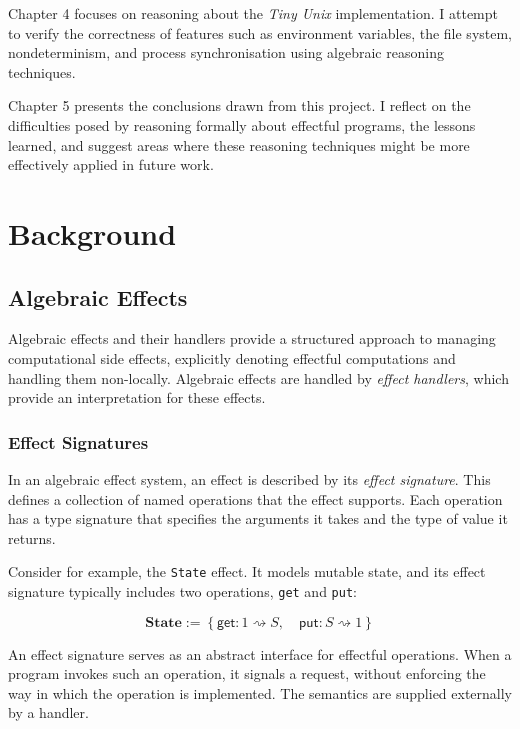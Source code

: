 \documentclass[logo,bsc,singlespacing,parskip]{infthesis}
\begin{document}
Chapter 4 focuses on reasoning about the \textit{Tiny Unix} implementation. I attempt to verify the correctness of features such as environment variables, the file system, nondeterminism, and process synchronisation using algebraic reasoning techniques.

Chapter 5 presents the conclusions drawn from this project. I reflect on the difficulties posed by reasoning formally about effectful programs, the lessons learned, and suggest areas where these reasoning techniques might be more effectively applied in future work.


\chapter{Background}

\section{Algebraic Effects}

Algebraic effects \cite{plotkin_handling_2013} and their handlers \cite{pretnar_introduction_2015} provide a structured approach to managing computational side effects, explicitly denoting effectful computations and handling them non-locally. Algebraic effects are handled by \textit{effect handlers}, which provide an interpretation for these effects.

\subsection{Effect Signatures}
In an algebraic effect system, an effect is described by its \textit{effect signature}. This defines a collection of named operations that the effect supports. Each operation has a type signature that specifies the arguments it takes and the type of value it returns.

Consider for example, the \texttt{State} effect. It  models mutable state, and its effect signature typically includes two operations, \texttt{get} and \texttt{put}:

\[
\textbf{State} := \left\{
\mathsf{get} : 1 \rightsquigarrow S, \quad
\mathsf{put} : S \rightsquigarrow 1
\right\}
\]

An effect signature serves as an abstract interface for effectful operations. When a program invokes such an operation, it signals a request, without enforcing the way in which the operation is implemented. The semantics are supplied externally by a handler.
\end{document}
